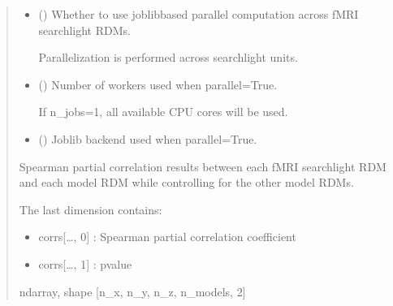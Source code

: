 \documentclass[letterpaper,10pt,english]{sphinxhowto}
\begin{document}
\begin{fulllineitems}
\begin{quote}
\begin{description}
\begin{itemize}
\sphinxAtStartPar
n\_x, n\_y, and n\_z represent the number of searchlight units along
the x, y, and z axes.


\item {} 
\sphinxAtStartPar
{} (\sphinxstyleliteralemphasis{\sphinxupquote{, }}) \textendash{} 
\sphinxAtStartPar
Whether to use joblib\sphinxhyphen{}based parallel computation across fMRI
searchlight RDMs.

\sphinxAtStartPar
Parallelization is performed across searchlight units.


\item {} 
\sphinxAtStartPar
{} (\sphinxstyleliteralemphasis{\sphinxupquote{, }}) \textendash{} 
\sphinxAtStartPar
Number of workers used when parallel=True.

\sphinxAtStartPar
If n\_jobs=\sphinxhyphen{}1, all available CPU cores will be used.


\item {} 
\sphinxAtStartPar
{} (\sphinxstyleliteralemphasis{\sphinxupquote{, }}\sphinxstyleliteralemphasis{\sphinxupquote{, }}) \textendash{} Joblib backend used when parallel=True.

\end{itemize}

\sphinxAtStartPar

\sphinxAtStartPar
{} \textendash{} Spearman partial correlation results between each fMRI searchlight RDM
and each model RDM while controlling for the other model RDMs.

\sphinxAtStartPar
The last dimension contains:
\begin{itemize}
\item {} 
\sphinxAtStartPar
corrs{[}…, 0{]} : Spearman partial correlation coefficient

\item {} 
\sphinxAtStartPar
corrs{[}…, 1{]} : p\sphinxhyphen{}value

\end{itemize}


\sphinxAtStartPar
ndarray, shape {[}n\_x, n\_y, n\_z, n\_models, 2{]}

\end{description}\end{quote}

\end{fulllineitems}
\end{document}
